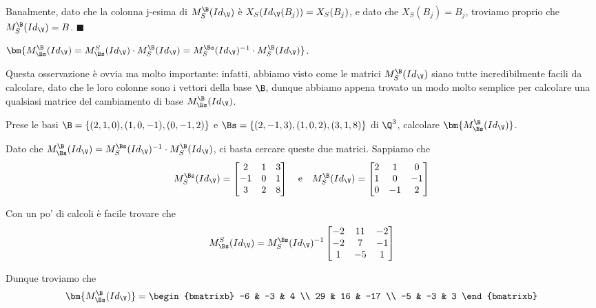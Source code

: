 \documentclass[11pt, a4paper, titlepage, oneside]{scrbook}
\begin{document}
\Dimostrazione \nopagebreak

Banalmente, dato che la colonna j-esima di $M_S^\B(Id_\V)$ è $X_S(Id_\V(B_j)) = X_S(B_j)$, e dato che $X_S(B_j) = B_j$, troviamo proprio che $M_S^\B(Id_\V) = B$. $\blacksquare$ 

\begin{Osservazione}[]
\label{oss-matrice-cambiamento-base-passare-per-due-basi}
$\bm{M_\Bs^\B(Id_\V) = M_\Bs^S(Id_\V) \cdot M_S^\B(Id_\V) = M_S^\Bs(Id_\V)^{-1} \cdot M_S^\B(Id_\V)}$.
\end{Osservazione}
Questa osservazione è ovvia ma molto importante: infatti, abbiamo visto come le matrici $M_S^\B(Id_\V)$ siano tutte incredibilmente facili da calcolare, dato che le loro colonne sono i vettori della base $\B$, dunque abbiamo appena trovato un modo molto semplice per calcolare una qualsiasi matrice del cambiamento di base $M_\Bs^\B(Id_\V)$. 

\Esempio \nopagebreak

Prese le basi $\B = \{(2,1,0), (1,0,-1), (0,-1,2)\}$ e $\Bs = \{(2,-1,3), (1,0,2), (3,1,8)\}$ di $\Q^3$, calcolare $\bm{M_\Bs^\B(Id_\V)}$. \nopagebreak

Dato che $M_\Bs^\B(Id_\V) = M_S^\Bs(Id_\V)^{-1} \cdot M_S^\B(Id_\V)$, ci basta cercare queste due matrici. Sappiamo che 
\[
M_S^\Bs(Id_\V) = \begin{bmatrix}
    2 & 1 & 3 \\ 
    -1 & 0 & 1 \\
    3 & 2 & 8
\end{bmatrix}
\quad \text{e} \quad
M_S^\B(Id_\V) = \begin{bmatrix}
    2 & 1 & 0 \\
    1 & 0 & -1  \\
    0 & -1 & 2
\end{bmatrix}
\]

Con un po' di calcoli è facile trovare che 
\[M_\Bs^S(Id_\V) =  M_S^\Bs(Id_\V)^{-1}
\begin{bmatrix}
    -2 & 11 & -2 \\
    -2 & 7 & -1 \\
    1 & -5 & 1
\end{bmatrix}
\]

Dunque troviamo che
\[
\bm{M_\Bs^\B(Id_\V)} = 
\begin{bmatrixb}
    -6 & -3 & 4 \\
    29 & 16 & -17 \\
    -5 & -3 & 3
\end{bmatrixb}
\]
\end{document}
